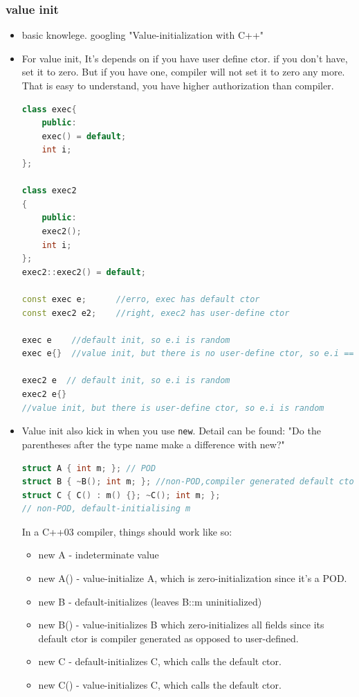 \documentclass[a4paper,11pt,twoside]{book}
\begin{document}
\subsubsection{value init}
\begin{itemize}
	\item basic knowlege. googling "Value-initialization with C++"
	
	\item For value init, It's depends on if you have user define ctor. if you don't have, set it to zero. But if you have one, compiler will not set it to zero any more. That is easy to understand, you have higher authorization than compiler. 
	
\begin{lstlisting}[frame=single, language=c++]
class exec{
	public:
	exec() = default;
	int i;
};
	
class exec2
{
	public:
	exec2();
	int i;
};
exec2::exec2() = default;
	
const exec e;      //erro, exec has default ctor
const exec2 e2;    //right, exec2 has user-define ctor

exec e    //default init, so e.i is random
exec e{}  //value init, but there is no user-define ctor, so e.i == 0
	
exec2 e  // default init, so e.i is random
exec2 e{}  
//value init, but there is user-define ctor, so e.i is random
\end{lstlisting}
	
	\item Value init also kick in when you use \texttt{new}. Detail can be found: "Do the parentheses after the type name make a difference with new?"
	
\begin{lstlisting}[frame=single, language=c++]
struct A { int m; }; // POD
struct B { ~B(); int m; }; //non-POD,compiler generated default ctor
struct C { C() : m() {}; ~C(); int m; }; 
// non-POD, default-initialising m
\end{lstlisting}
	
	In a C++03 compiler, things should work like so:
	\begin{itemize}
		\item new A - indeterminate value
		\item new A() - value-initialize A, which is zero-initialization since it's a POD.
		
		\item new B - default-initializes (leaves B::m uninitialized)
		
		\item new B() - value-initializes B which zero-initializes all fields since its default ctor is compiler generated as opposed to user-defined.
		
		\item new C - default-initializes C, which calls the default ctor.
		
		\item new C() - value-initializes C, which calls the default ctor.
	\end{itemize}
\end{itemize}
\end{document}
